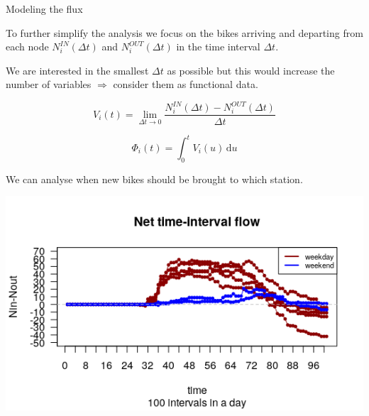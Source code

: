 \documentclass{beamer}
\begin{document}
\begin{frame}{Modeling the flux}

To further simplify the analysis we focus on the bikes arriving and departing from each node $N_i^{IN}(\Delta t)$ and $N_i^{OUT}(\Delta t)$ in the time interval $\Delta t$.

\vspace{5mm}

We are interested in the smallest $\Delta t$ as possible but this would increase the number of variables $\Rightarrow$ consider them as \alert{functional data}.

\centering
		$$V_i(t) = \lim_{\Delta t \to 0} \frac{N_i^{IN}(\Delta t) - N_i^{OUT}(\Delta t)}{\Delta t}$$

$$\Phi_i(t) = \int_{0}^{t}V_i(u)\,\mathrm{d}u$$

\end{frame}

\begin{frame}
We can analyse \alert{when new bikes should be brought to which station}.

		\includegraphics[width=1\textwidth]{pictures/flux.png} 

\end{frame}
\end{document}
